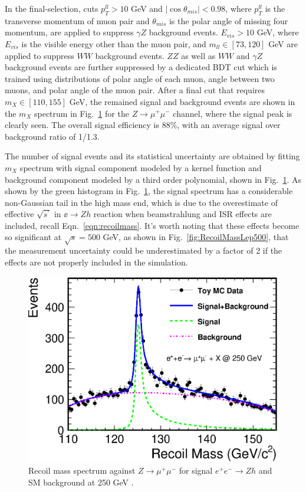 In the final-selection, cuts $p_T^{ll}>10$ GeV and $|\cos\theta_{mis}|<0.98$,
where $p_T^{ll}$ is the transverse momentum of muon pair and $\theta_{mis}$
is the polar angle of missing four momentum, are applied to suppress
$\gamma Z$ background events. $E_{vis}>10$ GeV,
where $E_{vis}$ is the visible energy other than the muon pair,
and $m_{ll}\in[73,120]$ GeV
are applied to suppress $WW$ background events. 
$ZZ$ as well as $WW$ and $\gamma Z$ background events are
further suppressed by a dedicated BDT cut 
which is trained using distributions of polar angle of each muon,
angle between two muons, and polar angle of the muon pair. After a final cut that requires
$m_X\in[110, 155]$ GeV, the remained signal and background events are 
shown in the $m_X$ spectrum in Fig.~\ref{fig:RecoilMassLep250} 
for the $Z\to\mu^+\mu^-$ channel, where the signal peak is clearly seen.
The overall signal efficiency is 88\%, with an
average signal over background ratio of 1/1.3.

The number of signal events and its statistical uncertainty are obtained by 
fitting $m_X$ spectrum with signal component modeled by a kernel function
and background component modeled by a third order polynomial, 
shown in Fig.~\ref{fig:RecoilMassLep250}. As shown by the green histogram in Fig.~\ref{fig:RecoilMassLep250},
the signal spectrum has a 
considerable non-Gaussian tail in the high mass end, which is due to
the overestimate of effective $\sqrt{s^\prime}$ in $\ee\to Zh$ reaction 
when beamstrahlung and ISR effects are included, recall Eqn.~\ref{eqn:recoilmass}.
It's worth noting that these effects become so significant at $\sqrt{s}=500$ GeV,
as shown in Fig.~\ref{fig:RecoilMassLep500},
that the measurement uncertainty could be underestimated by a factor of 2
if the effects are not properly included in the simulation. 

\begin{figure}
\begin{center}
\includegraphics[width=0.85\hsize]{chapters/figures/RecoilMassLep250.eps}
\end{center}
  \caption{Recoil mass spectrum against
 $Z\to\mu^+\mu^-$ for signal $e^+e^-\to Zh$ and SM background 
  at 250 GeV \cite{Yan:2016xyx}.}
  \label{fig:RecoilMassLep250}
\end{figure}

